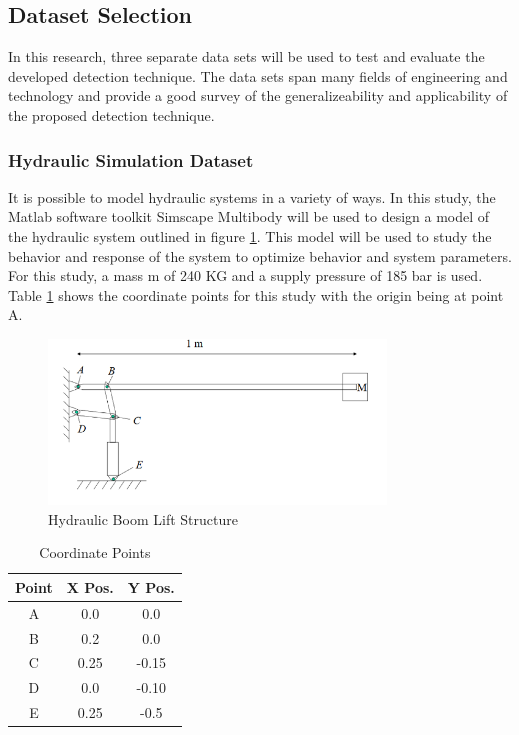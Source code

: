 \subsection{Dataset Selection}

In this research, three separate data sets will be used to test and evaluate the developed detection technique. The data sets span many fields of engineering and technology and provide a good survey of the generalizeability and applicability of the proposed detection technique.  

\subsubsection{Hydraulic Simulation Dataset}

It is possible to model hydraulic systems in a variety of ways. In this study, the Matlab software toolkit Simscape Multibody will be used to design a model of the hydraulic system outlined in figure \ref{fig:boom_structure}. This model will be used to study the behavior and response of the system to optimize behavior and system parameters. For this study, a mass m of 240 KG and a supply pressure of 185 bar is used. Table \ref{tab:points} shows the coordinate points for this study with the origin being at point A.

 \begin{figure}[H]
    \centering
    \includegraphics[width=0.8\textwidth]{1_hydraulic_sim/BoomStructure.PNG}
    \caption{Hydraulic Boom Lift Structure}
    \label{fig:boom_structure}
 \end{figure}
 
 \begin{table}[H]
\centering
\begin{tabular}{||c c c ||} 
 \hline
 Point & X Pos. & Y Pos. \\ [0.5ex] 
 \hline\hline
 A & 0.0 & 0.0 \\
 B & 0.2 & 0.0 \\
 C & 0.25 & -0.15 \\
 D & 0.0 & -0.10 \\
 E & 0.25 & -0.5 \\ [1ex] 
 \hline
\end{tabular}
\caption{Coordinate Points}
\label{tab:points}
\end{table}

